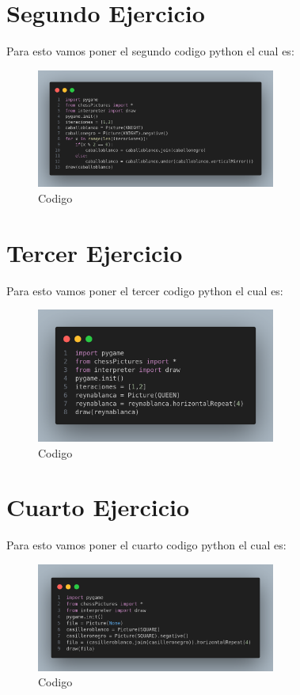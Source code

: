 \documentclass[10pt, a4paper]{article}
\begin{document}
\section{Segundo Ejercicio}
Para esto vamos poner el segundo codigo python el cual es:  
\begin{figure}[H]
  \centering
  \includegraphics[width=0.7\textwidth]{img/Ej2.png}
  \caption{Codigo}
\end{figure}

\section{Tercer Ejercicio}
Para esto vamos poner el tercer codigo python el cual es:  
\begin{figure}[H]
  \centering
  \includegraphics[width=0.7\textwidth]{img/Ej3.png}
  \caption{Codigo}
\end{figure}

\section{Cuarto Ejercicio}
Para esto vamos poner el cuarto codigo python el cual es:  
\begin{figure}[H]
  \centering
  \includegraphics[width=0.7\textwidth]{img/Ej4.png}
  \caption{Codigo}
\end{figure}
\end{document}
